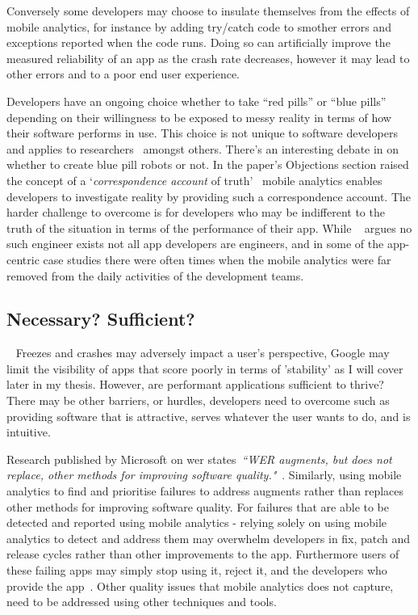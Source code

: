 Conversely some developers may choose to insulate themselves from the effects of mobile analytics, for instance by adding try/catch code to smother errors and exceptions reported when the code runs. Doing so can artificially improve the measured reliability of an app as the crash rate decreases, however it may lead to other errors and to a poor end user experience.

Developers have an ongoing choice whether to take ``red pills'' or ``blue pills''~ depending on their willingness to be exposed to messy reality in terms of how their software performs in use. This choice is not unique to software developers and applies to researchers~ amongst others. There's an interesting debate in  on whether to create blue pill robots or not. In the paper's Objections section raised the concept of a `\emph{correspondence account} of truth'~ mobile analytics enables developers to investigate reality by providing such a correspondence account. The harder challenge to overcome is for developers who may be indifferent to the truth of the situation in terms of the performance of their app. While ~ argues no such engineer exists not all app developers are engineers, and in some of the app-centric case studies there were often times when the mobile analytics were far removed from the daily activities of the development teams.

\subsection{Necessary? Sufficient?}~\label{discussion-necessary-sufficient-topic}
Freezes and crashes may adversely impact a user's perspective, Google may limit the visibility of apps that score poorly in terms of 'stability' as I will cover later in my thesis. However, are performant applications sufficient to thrive? There may be other barriers, or hurdles, developers need to overcome such as providing software that is attractive, serves whatever the user wants to do, and is intuitive.

Research published by Microsoft on \Gls{wer} states~\emph{``WER augments, but does not replace, other methods for improving software quality."}~. Similarly, using mobile analytics to find and prioritise failures to address augments rather than replaces other methods for improving software quality. For failures that are able to be detected and reported using mobile analytics - relying solely on using mobile analytics to detect and address them may overwhelm developers in fix, patch and release cycles rather than other improvements to the app. Furthermore users of these failing apps may simply stop using it, reject it, and the developers who provide the app~. Other quality issues that mobile analytics does not capture, need to be addressed using other techniques and tools.

